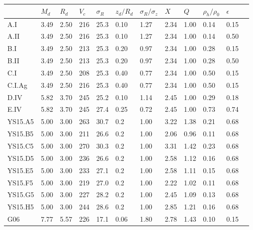 \begin{table}
\begin{tabular}{l l l l l l l l l l l l}
\hline
 & $M_d$ & $R_d$ & $V_c$ & $\sigma_R$ & $z_d/R_d$  & $\sigma_R/\sigma_z$  & $X$ &  $Q$ & $\rho_h/\rho_0$ & $\epsilon$ \\ 
\hline
A.I     & 3.49 & 2.50 & 216 & 25.3 & 0.10 & 1.27 & 2.34 & 1.00 & 0.14 & 0.15\\
A.II    & 3.49 & 2.50 & 216 & 25.3 & 0.10 & 1.27 & 2.34 & 1.00 & 0.14 & 0.50\\
B.I     & 3.49 & 2.50 & 213 & 25.3 & 0.20 & 0.97 & 2.34 & 1.00 & 0.28 & 0.15\\
B.II    & 3.49 & 2.50 & 213 & 25.3 & 0.20 & 0.97 & 2.34 & 1.00 & 0.28 & 0.50\\
C.I     & 3.49 & 2.50 & 208 & 25.3 & 0.40 & 0.77 & 2.34 & 1.00 & 0.50 & 0.15\\
C.I.Ag  & 3.49 & 2.50 & 216 & 25.3 & 0.40 & 0.77 & 2.34 & 1.00 & 0.50 & 0.15\\
D.IV    & 5.82 & 3.70 & 245 & 25.2 & 0.10 & 1.14 & 2.45 & 1.00 & 0.29 & 0.18\\
E.IV    & 5.82 & 3.70 & 245 & 27.4 & 0.25 & 0.72 & 2.45 & 1.00 & 0.73 & 0.74\\
\hline
YS15.A5 & 5.00 & 3.00 & 263 & 30.7  & 0.2 & 1.00 & 3.22 & 1.38 & 0.21 & 0.68\\
YS15.B5 & 5.00 & 3.00 & 211 & 26.6  & 0.2 & 1.00 & 2.06 & 0.96 & 0.11 & 0.68\\
YS15.C5 & 5.00 & 3.00 & 270 & 30.3  & 0.2 & 1.00 & 3.31 & 1.42 & 0.23 & 0.68\\
YS15.D5 & 5.00 & 3.00 & 236 & 26.6  & 0.2 & 1.00 & 2.58 & 1.12 & 0.16 & 0.68\\
YS15.E5 & 5.00 & 3.00 & 233 & 27.1  & 0.2 & 1.00 & 2.58 & 1.11 & 0.15 & 0.68\\
YS15.F5 & 5.00 & 3.00 & 219 & 27.0  & 0.2 & 1.00 & 2.22 & 1.02 & 0.11 & 0.68\\
YS15.G5 & 5.00 & 3.00 & 227 & 28.2  & 0.2 & 1.00 & 2.45 & 1.09 & 0.13 & 0.68\\
YS15.H5 & 5.00 & 3.00 & 244 & 28.6  & 0.2 & 1.00 & 2.85 & 1.21 & 0.16 & 0.68\\
\hline
G06     & 7.77 & 5.57 & 226 & 17.1  & 0.06  & 1.80 & 2.78 & 1.43 & 0.10 & 0.15 \\
\hline
\end{tabular}

\end{table}
